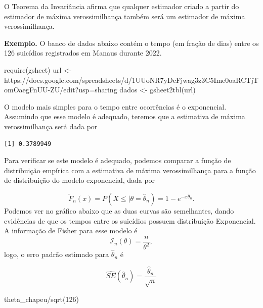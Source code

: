 \documentclass[
  letterpaper,
  DIV=11,
  numbers=noendperiod]{scrartcl}
\newenvironment{Shaded}{\begin{snugshade}}{\end{snugshade}}
\newcommand{\DecValTok}[1]{\textcolor[rgb]{0.68,0.00,0.00}{#1}}
\newcommand{\FunctionTok}[1]{\textcolor[rgb]{0.28,0.35,0.67}{#1}}
\newcommand{\NormalTok}[1]{\textcolor[rgb]{0.00,0.23,0.31}{#1}}
\newcommand{\OtherTok}[1]{\textcolor[rgb]{0.00,0.23,0.31}{#1}}
\newcommand{\SpecialCharTok}[1]{\textcolor[rgb]{0.37,0.37,0.37}{#1}}
\newcommand{\StringTok}[1]{\textcolor[rgb]{0.13,0.47,0.30}{#1}}
\begin{document}
O Teorema da Invariância afirma que qualquer estimador criado a partir
do estimador de máxima verossimilhança também será um estimador de
máxima verossimilhança.

\textbf{Exemplo.} O banco de dados abaixo contém o tempo (em fração de
dias) entre os 126 suicídios registrados em Manaus durante 2022.

\begin{Shaded}
\begin{Highlighting}[]
\FunctionTok{require}\NormalTok{(gsheet)}
\NormalTok{url }\OtherTok{\textless{}{-}} \StringTok{\textquotesingle{}https://docs.google.com/spreadsheets/d/1UUoNR7yDcFjwag3z3C5Ime0oaRCTjTomOaegFnUU{-}ZU/edit?usp=sharing\textquotesingle{}}
\NormalTok{dados }\OtherTok{\textless{}{-}} \FunctionTok{gsheet2tbl}\NormalTok{(url)}
\end{Highlighting}
\end{Shaded}

O modelo mais simples para o tempo entre ocorrências é o exponencial.
Assumindo que esse modelo é adequado, teremos que a estimativa de máxima
verossimilhança será dada por

\begin{Shaded}
\end{Shaded}

\begin{verbatim}
[1] 0.3789949
\end{verbatim}

Para verificar se este modelo é adequado, podemos comparar a função de
distribuição empírica com a estimativa de máxima verossimilhança para a
função de distribuição do modelo exponencial, dada por

\[\tilde{F}_n(x)=P(X\leq |\theta=\hat{\theta}_n)=1-e^{-x\hat{\theta}_n}.\]
Podemos ver no gráfico abaixo que as duas curvas são semelhantes, dando
evidências de que os tempos entre os suicídios possuem distribuição
Exponencial. A informação de Fisher para esse modelo é
\[\mathcal{I}_n(\theta)=\frac{n}{\theta^2},\] logo, o erro padrão
estimado para \(\hat{\theta}_n\) é

\[\widehat{SE}(\hat{\theta}_n)=\frac{\hat{\theta}_n}{\sqrt{n}}\]

\begin{Shaded}
\begin{Highlighting}[]
\NormalTok{theta\_chapeu}\SpecialCharTok{/}\FunctionTok{sqrt}\NormalTok{(}\DecValTok{126}\NormalTok{)}
\end{Highlighting}
\end{Shaded}
\end{document}

